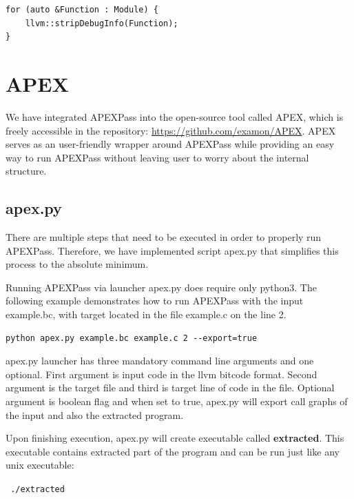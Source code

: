\documentclass[12pt, twoside]{fithesis2}
\renewcommand{\_}{\leavevmode \kern0.07em\vbox{\hrule width0.4em}}
\begin{document}
\begin{verbatim}
for (auto &Function : Module) {
    llvm::stripDebugInfo(Function);
}
\end{verbatim}

\section{APEX}
\label{sec:impl_launcher}

We have integrated APEXPass into the open-source tool called APEX, which is
freely accessible in the repository: \url{https://github.com/examon/APEX}.
APEX serves as an user-friendly wrapper around APEXPass
while providing an easy way to run APEXPass without leaving user to
worry about the internal structure.

\subsection{apex.py}

There are multiple steps that need to be executed in order to properly
run APEXPass. Therefore, we have implemented script apex.py that simplifies
this process to the absolute minimum.

Running APEXPass via launcher apex.py does require only python3. The following
example demonstrates how to run APEXPass with the input example.bc, with target
located in the file example.c on the line 2.

\begin{verbatim}
python apex.py example.bc example.c 2 --export=true
\end{verbatim}

apex.py launcher has three mandatory command line arguments and one optional.
First argument is input code in the llvm bitcode format. Second argument is the
target file and third is target line of code in the file.
Optional argument is boolean flag and when set to true, apex.py will
export call graphs of the input and also the extracted program.

Upon finishing execution, apex.py will create executable called
\textbf{extracted}. This executable contains extracted part of the program and
can be run just like any unix executable:

\texttt{
./extracted
}
\end{document}
